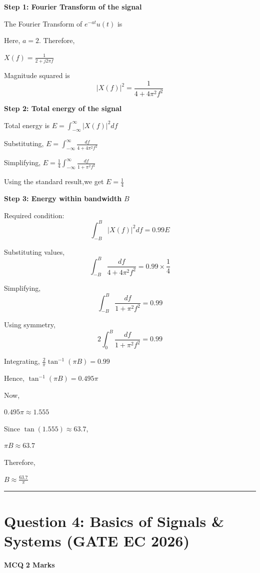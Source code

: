 \documentclass[11pt,a4paper]{article}
\begin{document}
\begin{tcolorbox}[solbox, title=Detailed Solution -- Question 3]
\textbf{Step 1: Fourier Transform of the signal}

The Fourier Transform of $e^{-at}u(t)$ is

Here, $a=2$. Therefore,

$X(f)=\frac{1}{2+j2\pi f}$

Magnitude squared is 
\[
|X(f)|^2
=
\frac{1}{4+4\pi^2f^2}
\]

\textbf{Step 2: Total energy of the signal}

Total energy is $E=\int_{-\infty}^{\infty}|X(f)|^2df$

Substituting, $E=\int_{-\infty}^{\infty}\frac{df}{4+4\pi^2f^2}$

Simplifying, $E=\frac{1}{4}\int_{-\infty}^{\infty}\frac{df}{1+\pi^2f^2}$

Using the standard result,we get $E=\frac{1}{4}$

\textbf{Step 3: Energy within bandwidth} $B$

Required condition: 
\[
\int_{-B}^{B}|X(f)|^2df
=
0.99E
\]

Substituting values, 
\[
\int_{-B}^{B}\frac{df}{4+4\pi^2f^2}
=
0.99\times\frac{1}{4}
\]

Simplifying, 
\[
\int_{-B}^{B}\frac{df}{1+\pi^2f^2}
=
0.99
\]

Using symmetry, 
\[
2\int_0^B\frac{df}{1+\pi^2f^2}
=
0.99
\]

Integrating,
$\frac{2}{\pi}\tan^{-1}(\pi B)=0.99$

Hence, $\tan^{-1}(\pi B)=0.495\pi$

Now,

$0.495\pi \approx 1.555$

Since $\tan(1.555)\approx63.7$,

$\pi B\approx63.7$

Therefore,

$B\approx\frac{63.7}{\pi}$
\end{tcolorbox}

\vspace{1.5em}
\hrule
\vspace{1.5em}

\section*{Question 4: Basics of Signals \& Systems (GATE EC 2026)}
\noindent \textbf{\color{primary}MCQ} \hfill \textbf{\color{secondary}2 Marks}
\end{document}
